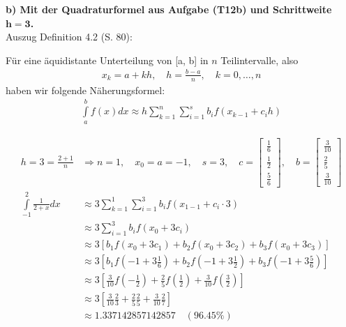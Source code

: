 \documentclass[10pt,a4paper]{article}
\begin{document}
        \textbf{%
        b) Mit der Quadraturformel aus Aufgabe (T12b) und Schrittweite $\mathbf{h=3}$.
        }\\
	    Auszug Definition 4.2 (S. 80):
	    \begin{mdframed}[linewidth=0pt,backgroundcolor=gray!20]
	    Für eine äquidistante Unterteilung von [a, b] in $n$ Teilintervalle, also
	    \begin{align}\tag{4.22}
		    x_k = a + k h,\quad h = \frac{b-a}{n} ,\quad k=0,\dots,n
	    \end{align}
	    haben wir folgende Näherungsformel:
		\begin{align}\tag{4.23}
			\int\limits_{a}^{b}f(x)dx \approx h\sum\limits_{k=1}^{n}\sum\limits_{i=1}^{s}b_if(x_{k-1}+c_ih)
		\end{align}
	\end{mdframed}
	    \begin{align*}
		    h=3=\frac{2+1}{n} &\Rightarrow n=1, \quad x_0=a=-1 ,\quad s=3, \quad
		    c = \begin{bmatrix}
			    \frac{1}{6} \\
			    \frac{1}{2} \\
			    \frac{5}{6}
		    \end{bmatrix}, \quad  b= \begin{bmatrix}
		    	\frac{3}{10} \\
		    	\frac{2}{5}  \\
		    	\frac{3}{10}
		    \end{bmatrix} \\
		\int\limits_{-1}^{2}\frac{1}{2+x}dx &\approx 3\sum\limits_{k=1}^{1}\sum\limits_{i=1}^{3}b_if(x_{1-1}+c_i\cdot3) \\
	    &\approx 3\sum\limits_{i=1}^{3}b_if(x_{0}+3c_i) \\
	    &\approx 3\left[b_1f(x_{0}+3c_1)+b_2f(x_{0}+3c_2)+b_3f(x_{0}+3c_3) \right] \\
	    &\approx 3\left[b_1f(-1+3\frac{1}{6})+b_2f(-1+3\frac{1}{2})+b_3f(-1+3\frac{5}{6})\right]  \\
	    &\approx 3\left[\frac{3}{10}f(-\frac{1}{2})+\frac{2}{5}f(\frac{1}{2})+\frac{3}{10}f(\frac{3}{2})\right]  \\
	    &\approx 3\left[\frac{3}{10}\frac{2}{3}+\frac{2}{5}\frac{2}{5}+\frac{3}{10}\frac{2}{7}\right]  \\
	    &\approx 1.337142857142857 \quad (96.45\%)
	    \end{align*}
	    
\end{document}

